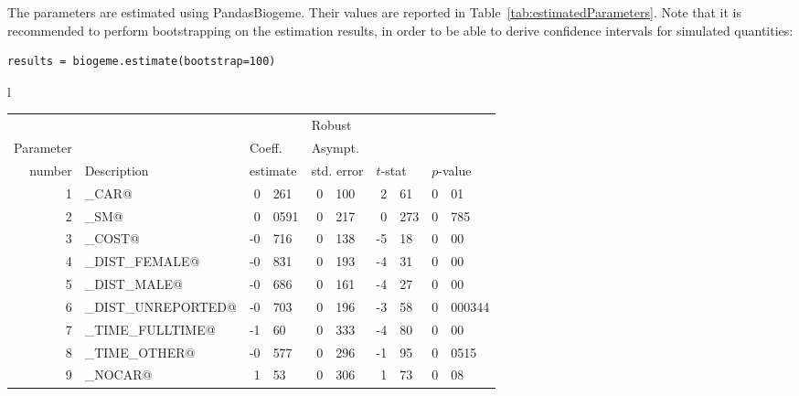 \documentclass[12pt,a4paper]{article}
\begin{document}
The parameters are estimated using PandasBiogeme. Their values are
reported in Table~\ref{tab:estimatedParameters}. Note that it is
recommended to perform bootstrapping on the estimation results, in
order to be able to derive confidence intervals for simulated
quantities:
\begin{lstlisting}[style=nonumbers]
results = biogeme.estimate(bootstrap=100)
\end{lstlisting}

\begin{table}[htb]
  \begin{tabular}{l}
\begin{tabular}{rlr@{.}lr@{.}lr@{.}lr@{.}l}
         &                       &   \multicolumn{2}{l}{}    & \multicolumn{2}{l}{Robust}  &     \multicolumn{4}{l}{}   \\
Parameter &                       &   \multicolumn{2}{l}{Coeff.}      & \multicolumn{2}{l}{Asympt.}  &     \multicolumn{4}{l}{}   \\
number &  Description                     &   \multicolumn{2}{l}{estimate}      & \multicolumn{2}{l}{std. error}  &   \multicolumn{2}{l}{$t$-stat}  &   \multicolumn{2}{l}{$p$-value}   \\

\hline

1 & \lstinline@ASC_CAR@ & 0&261 & 0&100 & 2&61 & 0&01\\
2 & \lstinline@ASC_SM@ & 0&0591 & 0&217 & 0&273 & 0&785\\
3 & \lstinline@BETA_COST@ & -0&716 & 0&138 & -5&18 & 0&00\\
4 & \lstinline@BETA_DIST_FEMALE@ & -0&831 & 0&193 & -4&31 & 0&00\\
5 & \lstinline@BETA_DIST_MALE@ & -0&686 & 0&161 & -4&27 & 0&00\\
6 & \lstinline@BETA_DIST_UNREPORTED@ & -0&703 & 0&196 & -3&58 & 0&000344\\
7 & \lstinline@BETA_TIME_FULLTIME@ & -1&60 & 0&333 & -4&80 & 0&00\\
8 & \lstinline@BETA_TIME_OTHER@ & -0&577 & 0&296 & -1&95 & 0&0515\\
9 & \lstinline@NEST_NOCAR@ & 1&53 & 0&306 & 1&73\footnotemark[1] & 0&08\\


\end{tabular}
\end{tabular}
\end{table}
\end{document}
